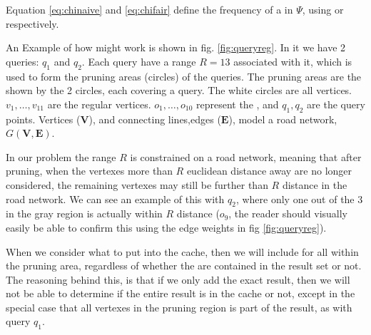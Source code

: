 Equation \ref{eq:chinaive} and \ref{eq:chifair} define the frequency of a \spath in $\Psi$, using \naive or \fair respectively.

An Example of how \fair might work is shown in fig. \ref{fig:queryreg}. In it we have 2 queries: $q_1$ and $q_2$. Each query have a range $R=13$ associated with it, which is used to form the pruning areas (circles) of the queries. The pruning areas are the shown by the 2 circles, each covering a query. The  white circles are all vertices. $v_1,\ldots,v_{11}$ are the regular vertices. $o_1,\ldots,o_{10}$ represent the \poisns, and $q_1,q_2$ are the query points. Vertices ($\mathbf{V}$), and connecting lines,edges ($\mathbf{E}$), model a road network, $G\mathbf{(V,E)}$.

In our problem the range $R$ is constrained on a road network, meaning that after pruning, when the vertexes more than $R$ euclidean distance away are no longer considered, the remaining vertexes may still be further than $R$ distance in the road network. 
We can see an example of this with $q_2$, where only one out of the 3 \poi in the gray region is actually within $R$ \spath distance ($o_9$, the reader should visually easily be able to confirm this using the edge weights in fig \ref{fig:queryreg}).

When we consider what to put into the cache, then we will include \spaths for all \poi within the pruning area, regardless of whether the \pois are contained in the result set or not. The reasoning behind this, is that if we only add the exact result, then we will not be able to determine if the entire result is in the cache or not, except in the special case that all vertexes in the pruning region is part of the result, as with query $q_1$.





